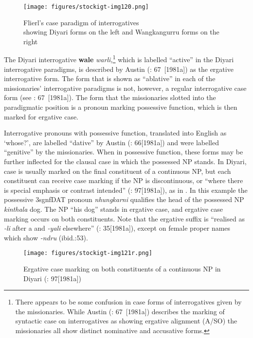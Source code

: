 \begin{figure}
\texttt{[image: figures/stockigt-img120.png]}
\caption{Flierl’s case paradigm of interrogatives \citeyearpar[22--23]{flierl_christianieli_1880}\\
showing Diyari forms on the left and Wangkangurru forms on the right}
\label{bkm:Ref449368941}\label{fig:key:8-171}
\end{figure}


The Diyari interrogative \textbf{wale} \textit{warli,}\footnote{There appears to be some confusion in case forms of interrogatives given by the missionaries. While Austin (\citeyear{austin_grammar_2013}: 67~[1981a]) describes the marking of syntactic case on interrogatives as showing ergative alignment (A/SO) the missionaries all show distinct nominative and accusative forms.} which is labelled “active” in the Diyari interrogative paradigms, is described by Austin (\citeyear{austin_grammar_2013}: 67~[1981a]) as the ergative interrogative form. The form that is shown as “ablative” in each of the missionaries' interrogative paradigms is not, however, a regular interrogative case form (see \citealt{austin_grammar_2013}: 67~[1981a]). The form that the missionaries slotted into the paradigmatic position is a pronoun marking possessive function, which is then marked for ergative case.

Interrogative pronouns with possessive function, translated into English as `whose?’, are labelled “dative” by Austin (\citeyear{austin_grammar_2013}: 66[1981a]) and were labelled “genitive” by the missionaries. When in possessive function, these forms may be further inflected for the clausal case in which the possessed NP stands. In Diyari, case is usually marked on the final constituent of a continuous NP, but each constituent can receive case marking if the NP is discontinuous, or “where there is special emphasis or contrast intended” (\citealt{austin_grammar_2013}: 97[1981a]), as in . In this example the possessive 3sgnfDAT pronoun \textit{nhungkarni} qualifies the head of the possessed NP \textit{kinthala} dog. The NP “his dog” stands in ergative case, and ergative case marking occurs on both constituents. Note that the ergative suffix is “realised as \textit{{}-li} after a and \textit{{}-yali} elsewhere” (\citealt{austin_grammar_2013}: 35[1981a]), except on female proper names which show \textit{{}-ndru} (ibid.:53).


\begin{figure}
\texttt{[image: figures/stockigt-img121r.png]}
\caption{Ergative case marking on both constituents of a continuous NP in Diyari (\citealt{austin_grammar_2013}: 97[1981a])}
\label{bkm:Ref466897668}\label{fig:key:8-172}
\end{figure}

